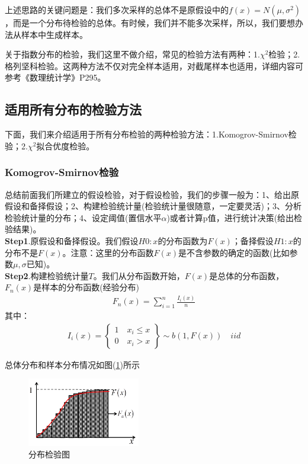         \par
        上述思路的关键问题是：我们多次采样的总体不是原假设中的$f(x) = N(\mu,\sigma^2)$，而是一个分布待检验的总体。有时候，我们并不能多次采样，所以，我们要想办法从样本中生成样本。
        \par
        关于指数分布的检验，我们这里不做介绍，常见的检验方法有两种：1.$\chi^2$检验；2.格列坚科检验。这两种方法不仅对完全样本适用，对截尾样本也适用，详细内容可参考《数理统计学》P295。
    \subsection{适用所有分布的检验方法}
        \par
        下面，我们来介绍适用于所有分布检验的两种检验方法：1.Komogrov-Smirnov检验；2.$\chi^2$拟合优度检验。
        \subsubsection{Komogrov-Smirnov检验}
            总结前面我们所建立的假设检验，对于假设检验，我们的步骤一般为：1、给出原假设和备择假设；2、构建检验统计量(检验统计量很随意，一定要灵活)；3、分析检验统计量的分布；4、设定阈值(置信水平$\alpha$)或者计算p值，进行统计决策(给出检验结果)。\\
            \textbf{Step1}.原假设和备择假设。我们假设$H0:x$的分布函数为$F(x)$；备择假设$H1:x$的分布不是$F(x)$。注意：这里的分布函数$F(x)$是不含参数的确定的函数(比如参数$\mu,\sigma$已知)。\\
            \textbf{Step2}.构建检验统计量$T$。我们从分布函数开始，$F(x)$是总体的分布函数，$F_n(x)$是样本的分布函数(经验分布)
            \begin{align*}
            F_n(x) = \sum_{i=1}^n \frac{I_i(x)}{n}
            \end{align*}
            其中：
            \begin{align*}
            I_i(x) =
            \left\{
              \begin{aligned}
              1\quad x_i  \leqslant x\\
              0\quad x_i > x
              \end{aligned}
            \right\}
            \sim b(1,F(x)) \quad iid
            \end{align*}
            \par
            总体分布和样本分布情况如图(\ref{fig:分布检验图})所示
            \begin{figure}[H]
            \centering
            \includegraphics[height=3cm]{images/distribution_test.jpg}
            \caption{分布检验图}
            \label{fig:分布检验图}
            \end{figure}
